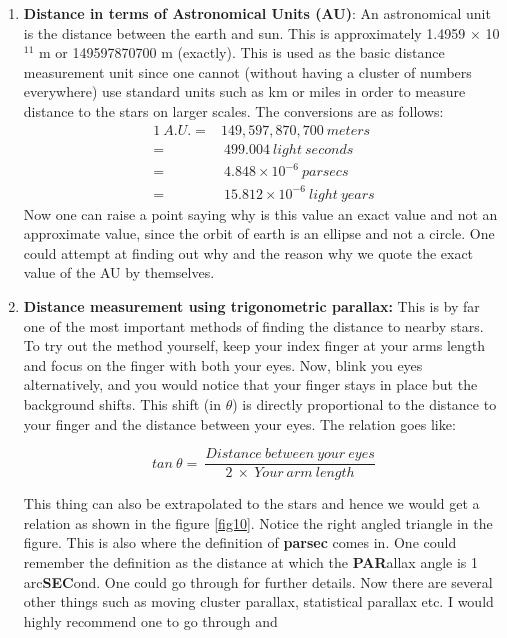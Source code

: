 \documentclass[a4paper,twoside,11pt]{article}
\numberwithin{equation}{section}
\begin{document}
\begin{enumerate}
    \item \textbf{Distance in terms of Astronomical Units (AU)}: An astronomical unit is the distance between the earth and sun. This is approximately 1.4959 $\times$ 10$^{11}$ m or 149597870700 m (exactly). This is used as the basic distance measurement unit since one cannot (without having a cluster of numbers everywhere) use standard units such as km or miles in order to measure distance to the stars on larger scales. The conversions are as follows:
    \begin{align*}
        1 \ A.U. =& 149,597,870,700 \ meters \\
        =& \ 499.004 \ light \ seconds \\
        =& \ 4.848 \times 10^{-6} \ parsecs \\
        =& \ 15.812 \times 10^{-6} \ light \ years
    \end{align*}
    Now one can raise a point saying why is this value an exact value and not an approximate value, since the orbit of earth is an ellipse and not a circle. One could attempt at finding out why and the reason why we quote the exact value of the AU by themselves.
    \item \textbf{Distance measurement using trigonometric parallax:} This is by far one of the most important methods of finding the distance to nearby stars. To try out the method yourself, keep your index finger at your arms length and focus on the finger with both your eyes. Now, blink you eyes alternatively, and you would notice that your finger stays in place but the background shifts. This shift (in $\theta$) is directly proportional to the distance to your finger and the distance between your eyes. The relation goes like:
    \begin{center}
        \begin{equation}
            tan \ \theta = \ \frac{Distance \ between \ your \ eyes}{2 \ \times \ Your \ arm \ length}
        \end{equation}
    \end{center} 
    This thing can also be extrapolated to the stars and hence we would get a relation as shown in the figure \ref{fig10}. Notice the right angled triangle in the figure. This is also where the definition of \textbf{parsec} comes in. One could remember the definition as the distance at which the \textbf{PAR}allax angle is 1 arc\textbf{SEC}ond. One could go through \cite{Parallax} for further details. Now there are several other things such as moving cluster parallax, statistical parallax etc. I would highly recommend one to go through \cite{ARC} and \cite{BasuIntro}
\end{enumerate}
\end{document}

